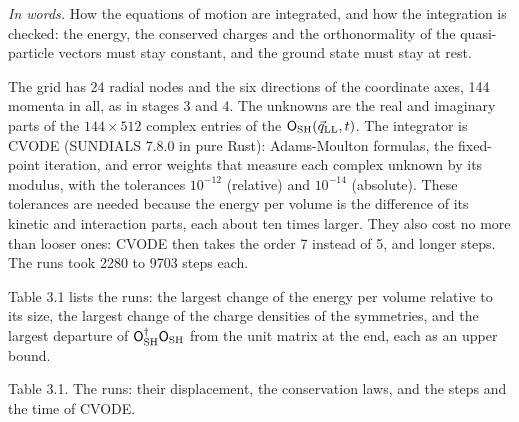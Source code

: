 \documentclass[
  10pt,
]{article}
\begin{document}
\emph{In words.} How the equations of motion are integrated, and how the
integration is checked: the energy, the conserved charges and the
orthonormality of the quasi-particle vectors must stay constant, and the
ground state must stay at rest.

The grid has 24 radial nodes and the six directions of the coordinate
axes, 144 momenta in all, as in stages 3 and 4. The unknowns are the
real and imaginary parts of the \(144\times512\) complex entries of the
\(\mathsf O_{\rm SH}(\vec q_{\rm LL},t)\). The integrator is CVODE
(SUNDIALS 7.8.0 in pure Rust): Adams-Moulton formulas, the fixed-point
iteration, and error weights that measure each complex unknown by its
modulus, with the tolerances \(10^{-12}\) (relative) and \(10^{-14}\)
(absolute). These tolerances are needed because the energy per volume is
the difference of its kinetic and interaction parts, each about ten
times larger. They also cost no more than looser ones: CVODE then takes
the order 7 instead of 5, and longer steps. The runs took 2280 to 9703
steps each.

Table 3.1 lists the runs: the largest change of the energy per volume
relative to its size, the largest change of the charge densities of the
symmetries, and the largest departure of
\(\mathsf O_{\rm SH}^\dagger\mathsf O_{\rm SH}\) from the unit matrix at
the end, each as an upper bound.

Table 3.1. The runs: their displacement, the conservation laws, and the
steps and the time of CVODE.
\end{document}
